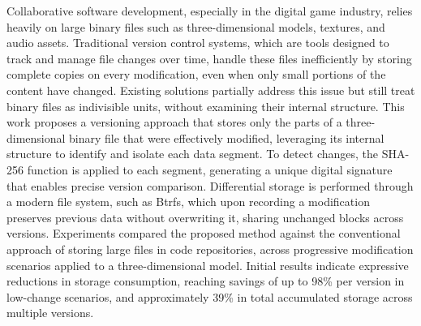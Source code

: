 
\begin{abstractutfpr}%
Collaborative software development, especially in the digital game industry, relies heavily on large binary files such as three-dimensional models, textures, and audio assets. Traditional version control systems, which are tools designed to track and manage file changes over time, handle these files inefficiently by storing complete copies on every modification, even when only small portions of the content have changed. Existing solutions partially address this issue but still treat binary files as indivisible units, without examining their internal structure. This work proposes a versioning approach that stores only the parts of a three-dimensional binary file that were effectively modified, leveraging its internal structure to identify and isolate each data segment. To detect changes, the SHA-256 function is applied to each segment, generating a unique digital signature that enables precise version comparison. Differential storage is performed through a modern file system, such as Btrfs, which upon recording a modification preserves previous data without overwriting it, sharing unchanged blocks across versions. Experiments compared the proposed method against the conventional approach of storing large files in code repositories, across progressive modification scenarios applied to a three-dimensional model. Initial results indicate expressive reductions in storage consumption, reaching savings of up to 98\% per version in low-change scenarios, and approximately 39\% in total accumulated storage across multiple versions.
\end{abstractutfpr}

